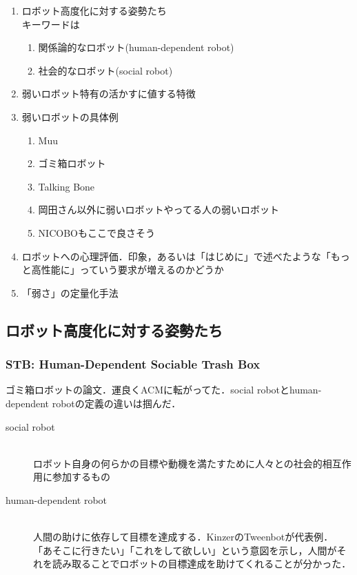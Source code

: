 \documentclass[fleqn,twocolumn]{mynote}
\begin{document}
  \begin{enumerate}
    \item ロボット高度化に対する姿勢たち \\ キーワードは
      \begin{enumerate}
        \item 関係論的なロボット(human-dependent robot)
        \item 社会的なロボット(social robot)
      \end{enumerate}
    \item 弱いロボット特有の活かすに値する特徴
    \item 弱いロボットの具体例
      \begin{enumerate}
        \item Muu
        \item ゴミ箱ロボット
        \item Talking Bone
        \item 岡田さん以外に弱いロボットやってる人の弱いロボット
        \item NICOBOもここで良さそう
      \end{enumerate}
    \item ロボットへの心理評価．印象，あるいは「はじめに」で述べたような「もっと高性能に」っていう要求が増えるのかどうか
    \item 「弱さ」の定量化手法
  \end{enumerate}

  \subsection*{ロボット高度化に対する姿勢たち}
  \subsubsection*{STB: Human-Dependent Sociable Trash Box}
  ゴミ箱ロボットの論文\cite{岡田美智男-2012-ゴミ箱ロ}．運良くACMに転がってた．social
  robotとhuman-dependent robotの定義の違いは掴んだ．

  \begin{description}
    \item[social robot]\mbox{}\\
      ロボット自身の何らかの目標や動機を満たすために人々との社会的相互作用に参加するもの
    \item[human-dependent robot]\mbox{}\\
      人間の助けに依存して目標を達成する．KinzerのTweenbotが代表例．\\
      「あそこに行きたい」「これをして欲しい」という意図を示し，人間がそれを読み取ることでロボットの目標達成を助けてくれることが分かった．
  \end{description}
\end{document}
